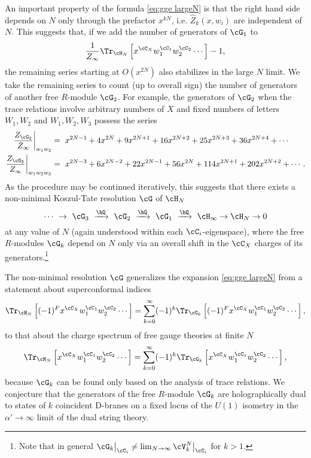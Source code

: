 \documentclass[a4paper,12pt]{article}
\begin{document}
An important property of the formula \eqref{eq:gge largeN} is that the right hand side depends on $N$ only through the prefactor $x^{k N}$, i.e. $\hat{Z}_k(x,w_i)$ are independent of $N$. This suggests that, if we add the number of generators of $\cG_1$ to
\begin{equation}
\frac{1}{Z_\infty} \Tr_{\cH_N} \left[ x^{\cC_X} w_1^{\cC_1} w_2^{\cC_2} \cdots \right] - 1,
\end{equation}
the remaining series starting at $O(x^{2N})$ also stabilizes in the large $N$ limit. We take the remaining series to count (up to overall sign) the number of generators of another free $R$-module $\cG_2$. For example, the generators of $\cG_2$ when the trace relations involve arbitrary numbers of $X$ and fixed numbers of letters $W_1, W_2$ and $W_1,W_2,W_3$ possess the series
\begin{align}
    \frac{Z_{\cG_{2}}}{Z_\infty} \bigg\rvert_{w_1 w_2} &= \ x^{2N-1} + 4 x^{2N} + 9 x^{2N+1} + 16 x^{2N+2} + 25 x^{2N+3} + 36 x^{2N+4} + \cdots \nonumber \\
    \frac{Z_{\cG_{2}}}{Z_\infty} \bigg\rvert_{w_1 w_2 w_3} &= \ x^{2N-3} + 6 x^{2N-2} + 22 x^{2N-1} + 56 x^{2N} + 114 x^{2N+1} + 202 x^{2N+2} + \cdots.
\end{align}
As the procedure may be continued iteratively, this suggests that there exists a non-minimal Koszul-Tate resolution $\cG$ of $\cH_N$
\begin{equation}
\cdots \ \rightarrow \ \cG_3 \ \xrightarrow{\hQ} \ \cG_2 \ \xrightarrow{\hQ} \ \cG_1 \ \xrightarrow{\hQ} \ \cH_\infty \rightarrow \cH_N \rightarrow 0
\end{equation}
at any value of $N$ (again understood within each $\cC_i$-eigenspace), where the free $R$-modules $\cG_k$ depend on $N$ only via an overall shift in the $\cC_X$ charges of its generators.\footnote{Note that in general $\cG_k \big\rvert_{\cC_i} \neq \lim_{N \to \infty} \cV_k^N \big\rvert_{\cC_i}$ for $k>1$.}

The non-minimal resolution $\cG$ generalizes the expansion \eqref{eq:gge largeN} from a statement about superconformal indices
\begin{equation}
\Tr_{\cH_N} \left[ (-1)^F x^{\cC_X} w_1^{\cC_1} w_2^{\cC_2} \cdots \right] = \sum_{k=0}^\infty (-1)^k \Tr_{\cG_k} \left[ (-1)^F x^{\cC_X} w_1^{\cC_1} w_2^{\cC_2} \cdots \right],
\end{equation}
to that about the charge spectrum of free gauge theories at finite $N$
\begin{equation}
\Tr_{\cH_N} \left[ x^{\cC_X} w_1^{\cC_1} w_2^{\cC_2} \cdots \right] = \sum_{k=0}^\infty (-1)^k \Tr_{\cG_k} \left[ x^{\cC_X} w_1^{\cC_1} w_2^{\cC_2} \cdots \right],
\end{equation}
because $\cG_k$ can be found only based on the analysis of trace relations. We conjecture that the generators of the free $R$-module $\cG_{k}$ are holographically dual to states of $k$ coincident D-branes on a fixed locus of the $U(1)$ isometry in the $\alpha' \to \infty$ limit of the dual string theory.
\end{document}

